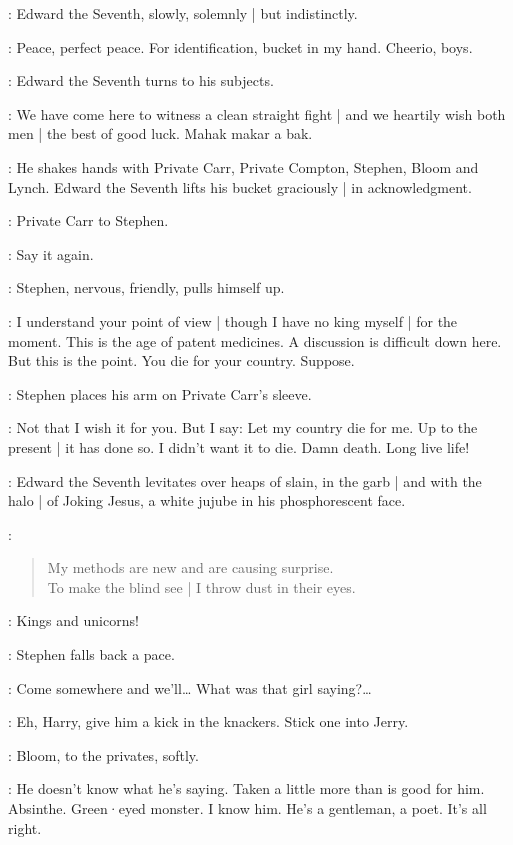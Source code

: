 :
Edward the Seventh,
slowly,
solemnly |
but indistinctly.

\EdwardSeventh:
Peace,
perfect peace.
For identification,
bucket in my hand.
%
Cheerio,
boys.

:
Edward the Seventh turns to his subjects.

\EdwardSeventh:
We have come here to witness a clean straight fight |
and we heartily wish both men |
the best of good luck.
Mahak makar a bak.

:
He shakes hands with Private Carr,
Private Compton,
Stephen,
Bloom
and Lynch.
Edward the Seventh lifts his bucket graciously |
in acknowledgment.

:
Private Carr to Stephen.

\Carr:
Say it again.

:
Stephen,
nervous,
friendly,
pulls himself up.

\Stephen:
I understand your point of view |
though I have no king myself |
for the moment.
%
This is the age of patent medicines.
A discussion is difficult down here.
But this is the point.
You die for your country.
Suppose.

:
Stephen places his arm on Private Carr's sleeve.

\Stephen:
Not that I wish it for you.
But I say:
Let my country die for me.
Up to the  present |
it has done so.
I didn't want it to die.
Damn death.
Long live life!

:
Edward the Seventh levitates over heaps of slain,
in the garb |
and with the halo |
of Joking Jesus,
a white jujube in his phosphorescent face.

\EdwardSeventh:
\begin{verse}
    My methods are new and are causing surprise.\\
    To make the blind see |
        I throw dust in their eyes.
\end{verse}

\Stephen:
Kings and unicorns!

:
Stephen falls back a pace.

\Stephen:
Come somewhere and we'll… 
What was that girl saying?…

\Compton[7b]:
Eh,
Harry,
give him a kick in the knackers.
Stick one into Jerry.

:
Bloom,
to the privates,
softly.

\Bloom:
He doesn't know what he's saying.
Taken a little more than is good for him.
Absinthe.
Green·eyed monster.
I know him.
He's a gentleman,
a poet.
It's all right.

